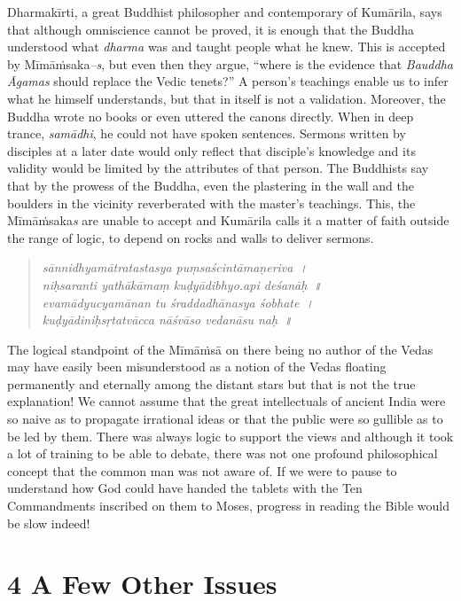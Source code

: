 Dharmakīrti, a great Buddhist philosopher and contemporary of Kumārila, says that although omniscience cannot be proved, it is enough that the Buddha understood what \textit{dharma} was and taught people what he knew. This is accepted by Mīmāṁsaka\textit{–s}, but even then they argue, “where is the evidence that \textit{Bauddha Āgamas} should replace the Vedic tenets?” A person’s teachings enable us to infer what he himself understands, but that in itself is not a validation. Moreover, the Buddha wrote no books or even uttered the canons directly. When in deep trance, \textit{samādhi}, he could not have spoken sentences. Sermons written by disciples at a later date would only reflect that disciple’s knowledge and its validity would be limited by the attributes of that person. The Buddhists say that by the prowess of the Buddha, even the plastering in the wall and the boulders in the vicinity reverberated with the master’s teachings. This, the Mīmāṁsaka\textit{s} are unable to accept and Kumārila calls it a matter of faith outside the range of logic, to depend on rocks and walls to deliver sermons.

\begin{verse}
\textit{sānnidhyamātratastasya puṃsaścintāmaṇeriva~।}\\\textit{niḥsaranti yathākāmaṃ kuḍyādibhyo.api deśanāḥ~॥} \\\textit{evamādyucyamānan tu śraddadhānasya śobhate~।}\\\textit{kuḍyādiniḥsṛtatvācca nāśvāso vedanāsu naḥ~॥} 
\end{verse}

The logical standpoint of the Mīmāṁsā on there being no author of the Vedas may have easily been misunderstood as a notion of the Vedas floating permanently and eternally among the distant stars but that is not the true explanation! We cannot assume that the great intellectuals of ancient India were so naive as to propagate irrational ideas or that the public were so gullible as to be led by them. There was always logic to support the views and although it took a lot of training to be able to debate, there was not one profound philosophical concept that the common man was not aware of. If we were to pause to understand how God could have handed the tablets with the Ten Commandments inscribed on them to Moses, progress in reading the Bible would be slow indeed!



\section*{4 A Few Other Issues}

